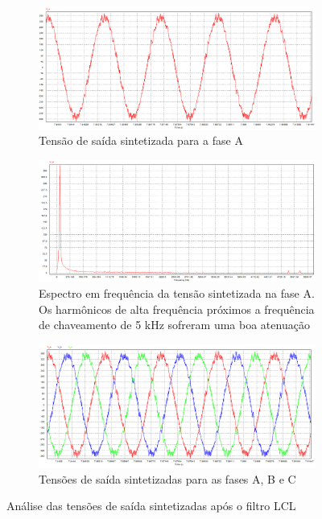 \begin{figure}[!hbt]
	\centering
	\begin{subfigure}[b]{0.7\textwidth}
		\centering
		\includegraphics[width=\textwidth]{figuras/sim_figures/inversor_e_boost/tensao_va.PNG}
		\caption{Tensão de saída sintetizada para a fase A}
   \end{subfigure}

   \begin{subfigure}[b]{0.7\textwidth}
		\centering
		\includegraphics[width=\textwidth]{figuras/sim_figures/inversor_e_boost/tensao_va_espectro.PNG}
		\caption{Espectro em frequência da tensão sintetizada na fase A. Os harmônicos de alta frequência próximos a frequência de chaveamento de 5 kHz sofreram uma boa atenuação}
   \end{subfigure}

	\begin{subfigure}[b]{0.7\textwidth}
		\centering
		\includegraphics[width=\textwidth]{figuras/sim_figures/inversor_e_boost/tensao_va_vb_vc.PNG}
		\caption{Tensões de saída sintetizadas para as fases A, B e C}
	\end{subfigure}
    \caption{Análise das tensões de saída sintetizadas após o filtro LCL}
    \label{fig:sim-tensao-saida-inversor}
\end{figure}

